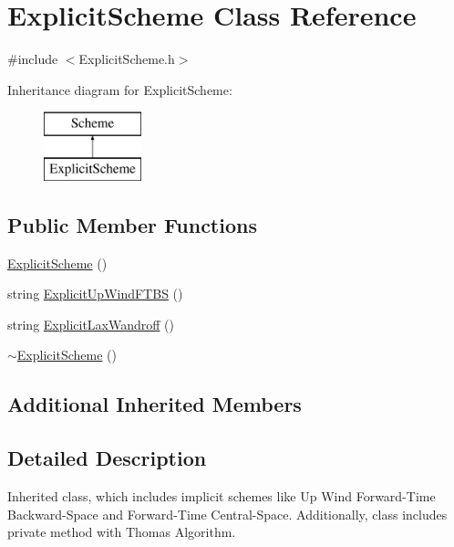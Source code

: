 \hypertarget{class_explicit_scheme}{}\section{Explicit\+Scheme Class Reference}
\label{class_explicit_scheme}


{\ttfamily \#include $<$Explicit\+Scheme.\+h$>$}

Inheritance diagram for Explicit\+Scheme\+:\begin{figure}[H]
\begin{center}
\leavevmode
\includegraphics[height=2.000000cm]{class_explicit_scheme}
\end{center}
\end{figure}
\subsection*{Public Member Functions}
\begin{DoxyCompactItemize}
\item 
\mbox{\hyperlink{class_explicit_scheme_ae63cfb8d333897b625dd17dc2acb4c46}{Explicit\+Scheme}} ()
\item 
string \mbox{\hyperlink{class_explicit_scheme_a52c0d19315a6014f43a9d007c70582d6}{Explicit\+Up\+Wind\+F\+T\+BS}} ()
\item 
string \mbox{\hyperlink{class_explicit_scheme_a2698e08e62763c56b972b478d665c34c}{Explicit\+Lax\+Wandroff}} ()
\item 
\mbox{\hyperlink{class_explicit_scheme_a5eee023f6f9d09609066a50dd620b49a}{$\sim$\+Explicit\+Scheme}} ()
\end{DoxyCompactItemize}
\subsection*{Additional Inherited Members}


\subsection{Detailed Description}
Inherited class, which includes implicit schemes like Up Wind Forward-\/\+Time Backward-\/\+Space and Forward-\/\+Time Central-\/\+Space. Additionally, class includes private method with Thomas Algorithm. 

